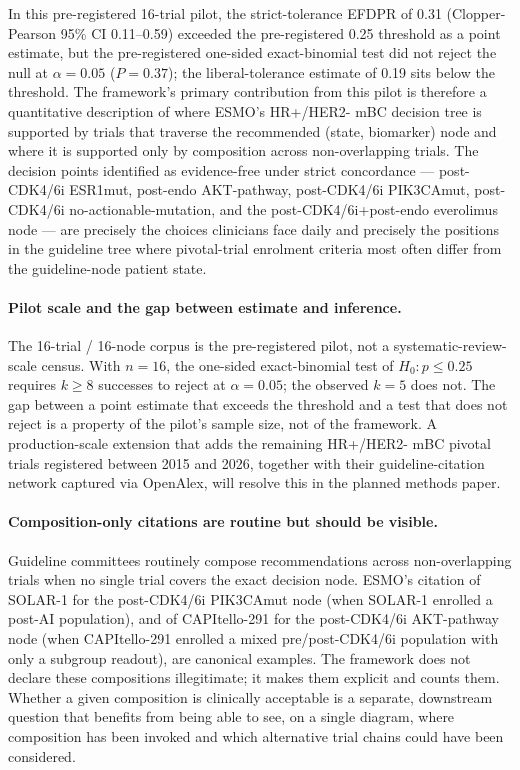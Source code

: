 
In this pre-registered 16-trial pilot, the strict-tolerance EFDPR of 0.31 (Clopper-Pearson 95\% CI 0.11--0.59) exceeded the pre-registered 0.25 threshold as a point estimate, but the pre-registered one-sided exact-binomial test did not reject the null at $\alpha = 0.05$ ($P = 0.37$); the liberal-tolerance estimate of 0.19 sits below the threshold. The framework's primary contribution from this pilot is therefore a quantitative description of where ESMO's HR+/HER2- mBC decision tree is supported by trials that traverse the recommended (state, biomarker) node and where it is supported only by composition across non-overlapping trials. The decision points identified as evidence-free under strict concordance --- post-CDK4/6i ESR1mut, post-endo AKT-pathway, post-CDK4/6i PIK3CAmut, post-CDK4/6i no-actionable-mutation, and the post-CDK4/6i+post-endo everolimus node --- are precisely the choices clinicians face daily and precisely the positions in the guideline tree where pivotal-trial enrolment criteria most often differ from the guideline-node patient state.

\paragraph{Pilot scale and the gap between estimate and inference.}
The 16-trial / 16-node corpus is the pre-registered pilot, not a systematic-review-scale census. With $n=16$, the one-sided exact-binomial test of $H_0: p \le 0.25$ requires $k \ge 8$ successes to reject at $\alpha = 0.05$; the observed $k=5$ does not. The gap between a point estimate that exceeds the threshold and a test that does not reject is a property of the pilot's sample size, not of the framework. A production-scale extension that adds the remaining HR+/HER2- mBC pivotal trials registered between 2015 and 2026, together with their guideline-citation network captured via OpenAlex, will resolve this in the planned methods paper.

\paragraph{Composition-only citations are routine but should be visible.}
Guideline committees routinely compose recommendations across non-overlapping trials when no single trial covers the exact decision node. ESMO's citation of SOLAR-1 for the post-CDK4/6i PIK3CAmut node (when SOLAR-1 enrolled a post-AI population), and of CAPItello-291 for the post-CDK4/6i AKT-pathway node (when CAPItello-291 enrolled a mixed pre/post-CDK4/6i population with only a subgroup readout), are canonical examples. The framework does not declare these compositions illegitimate; it makes them explicit and counts them. Whether a given composition is clinically acceptable is a separate, downstream question that benefits from being able to see, on a single diagram, where composition has been invoked and which alternative trial chains could have been considered.

